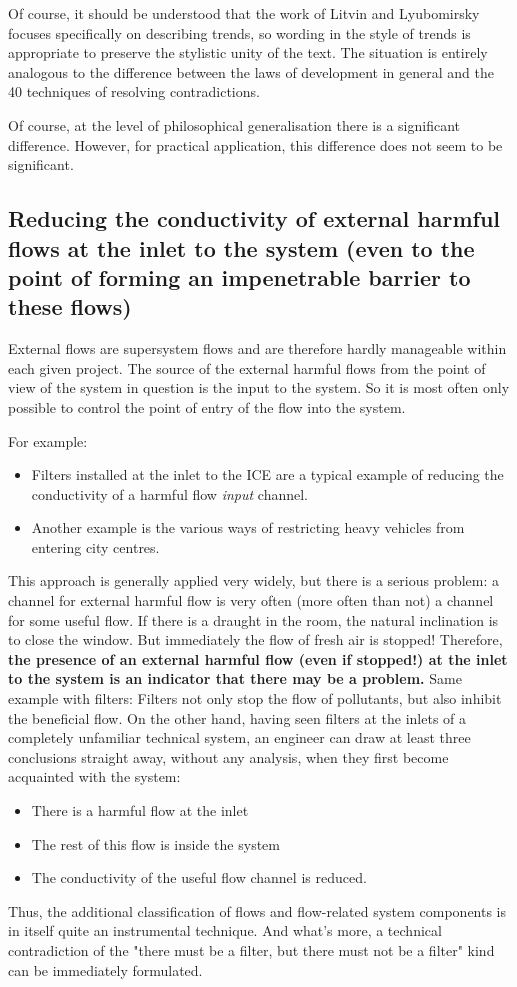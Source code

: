 \documentclass[a4paper,11pt]{article}
\begin{document}
Of course, it should be understood that the work of Litvin and Lyubomirsky
focuses specifically on describing trends, so wording in the style of trends
is appropriate to preserve the stylistic unity of the text. The situation is
entirely analogous to the difference between the laws of development in
general and the 40 techniques of resolving contradictions.

Of course, at the level of philosophical generalisation there is a significant
difference. However, for practical application, this difference does not seem
to be significant.

\subsection{Reducing the conductivity of external harmful flows at the inlet
  to the system (even to the point of forming an impenetrable barrier to these
  flows)}

External flows are supersystem flows and are therefore hardly manageable
within each given project. The source of the external harmful flows from the
point of view of the system in question is the input to the system. So it is
most often only possible to control the point of entry of the flow into the
system.

For example:
\begin{itemize}
\item Filters installed at the inlet to the ICE are a typical example of
  reducing the conductivity of a harmful flow \emph{input} channel.
\item Another example is the various ways of restricting heavy vehicles from
  entering city centres.
\end{itemize}
This approach is generally applied very widely, but there is a serious
problem: a channel for external harmful flow is very often (more often than
not) a channel for some useful flow. If there is a draught in the room, the
natural inclination is to close the window. But immediately the flow of fresh
air is stopped! Therefore, \textbf{the presence of an external harmful flow
  (even if stopped!) at the inlet to the system is an indicator that there may
  be a problem.} Same example with filters: Filters not only stop the flow of
pollutants, but also inhibit the beneficial flow. On the other hand, having
seen filters at the inlets of a completely unfamiliar technical system, an
engineer can draw at least three conclusions straight away, without any
analysis, when they first become acquainted with the system:
\begin{itemize}
\item There is a harmful flow at the inlet
\item The rest of this flow is inside the system
\item The conductivity of the useful flow channel is reduced.
\end{itemize}
Thus, the additional classification of flows and flow-related system
components is in itself quite an instrumental technique. And what's more, a
technical contradiction of the "there must be a filter, but there must not be
a filter" kind can be immediately formulated.
\end{document}
